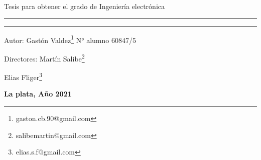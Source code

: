 \begin{titlepage}
{	
\vspace{-5mm}
\begin{center}
 \large{Tesis para obtener el grado de Ingeniería electrónica}
\end{center}
}
\vspace{-5mm}
\rule{\linewidth}{1mm}
{
\vspace{-2mm}
\begin{center}
	\textbf{\fontsize{20}{0}{\selectfont{Posicionador de antena para bajada de datos satelitales}}}
\end{center}
}
\rule{1\linewidth}{1mm} 	

 {\LARGE Autor: Gastón Valdez\footnote{gaston.cb.90@gmail.com} \hspace{50mm}  N° alumno 60847/5 \par} 
 {\LARGE Directores: Martín Salibe\footnote{salibemartin@gmail.com}\par} 
 {\hspace{28mm}\LARGE Elias Fliger\footnote{elias.s.f@gmail.com}\par} 

\vfill
{
 \begin{center}
 	\LARGE\textbf{La plata, Año 2021}
 \end{center} 
}
\end{titlepage}
